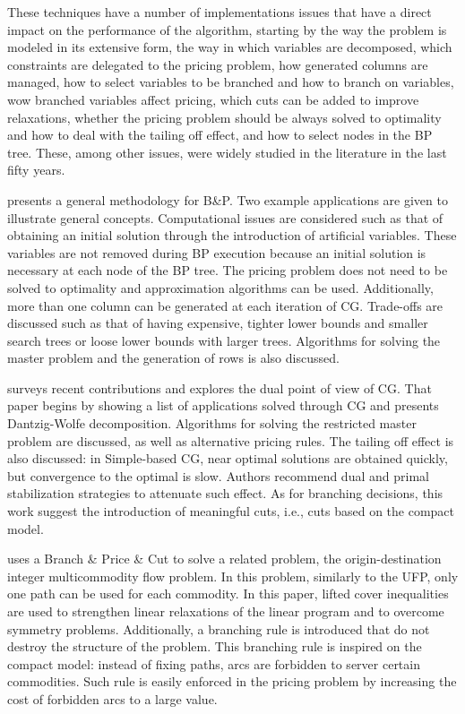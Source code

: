 These techniques have a number of implementations issues that have a direct impact on the performance of the algorithm,
starting by the way the problem is modeled in its extensive form,
the way in which variables are decomposed,
which constraints are delegated to the pricing problem,
how generated columns are managed,
how to select variables to be branched and how to branch on variables,
wow branched variables affect pricing,
which cuts can be added to improve relaxations,
whether the pricing problem should be always solved to optimality and how to deal with the tailing off effect,
and how to select nodes in the BP tree.
These, among other issues, were widely studied in the literature in the last fifty years.

\citet{Barnhart:1998} presents a general methodology for B\&P. Two example applications are given to illustrate general concepts. Computational issues are considered such as that of obtaining an initial solution through the introduction of artificial variables. These variables are not removed during BP execution because an initial solution is necessary at each node of the BP tree. The pricing problem does not need to be solved to optimality and approximation algorithms can be used. Additionally, more than one column can be generated at each iteration of CG. Trade-offs are discussed such as that of having expensive, tighter lower bounds and smaller search trees or loose lower bounds with larger trees. Algorithms for solving the master problem and the generation of rows is also discussed.

\citet{Lubbecke:04} surveys recent contributions and explores the dual point of view of CG. That paper begins by showing a list of applications solved through CG and presents Dantzig-Wolfe decomposition. Algorithms for solving the restricted master problem are discussed, as well as alternative pricing rules. The tailing off effect is also discussed: in Simple-based CG, near optimal solutions are obtained quickly, but convergence to the optimal is slow. Authors recommend dual and primal stabilization strategies to attenuate such effect. As for branching decisions, this work suggest the introduction of meaningful cuts, i.e., cuts based on the compact model.

\citet{Barnhart:2000} uses a Branch \& Price \& Cut to solve a related problem, the origin-destination integer multicommodity flow problem. In this problem, similarly to the UFP, only one path can be used for each commodity. In this paper, lifted cover inequalities are used to strengthen linear relaxations of the linear program and to overcome symmetry problems.
Additionally, a branching rule is introduced that do not destroy the structure of the problem. This branching rule is inspired on the compact model: instead of fixing paths, arcs are forbidden to server certain commodities. Such rule is easily enforced in the pricing problem by increasing the cost of forbidden arcs to a large value.
